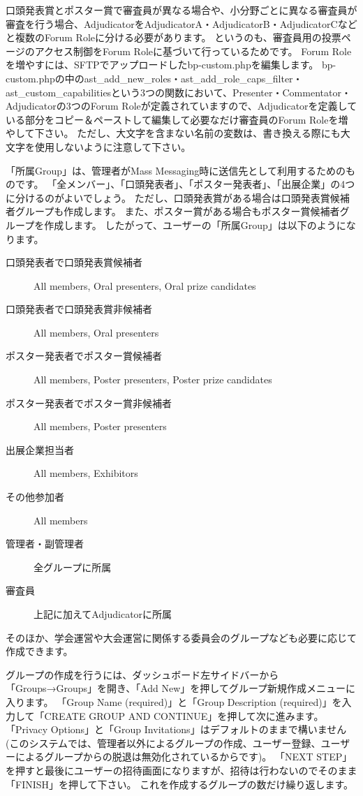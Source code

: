 \documentclass[titlepage,10pt,a4paper,uplatex]{jsbook}
\begin{document}
口頭発表賞とポスター賞で審査員が異なる場合や、小分野ごとに異なる審査員が審査を行う場合、AdjudicatorをAdjudicatorA・AdjudicatorB・AdjudicatorCなどと複数のForum Roleに分ける必要があります。
というのも、審査員用の投票ページのアクセス制御をForum Roleに基づいて行っているためです。
Forum Roleを増やすには、SFTPでアップロードしたbp-custom.phpを編集します。
bp-custom.phpの中のast\_add\_new\_roles・ast\_add\_role\_caps\_filter・ast\_custom\_capabilitiesという3つの関数において、Presenter・Commentator・Adjudicatorの3つのForum Roleが定義されていますので、Adjudicatorを定義している部分をコピー＆ペーストして編集して必要なだけ審査員のForum Roleを増やして下さい。
ただし、大文字を含まない名前の変数は、書き換える際にも大文字を使用しないように注意して下さい。

「所属Group」は、管理者がMass Messaging時に送信先として利用するためのものです。
「全メンバー」、「口頭発表者」、「ポスター発表者」、「出展企業」の4つに分けるのがよいでしょう。
ただし、口頭発表賞がある場合は口頭発表賞候補者グループも作成します。
また、ポスター賞がある場合もポスター賞候補者グループを作成します。
したがって、ユーザーの「所属Group」は以下のようになります。

\begin{description}
\item[口頭発表者で口頭発表賞候補者] All members, Oral presenters, Oral prize candidates
\item[口頭発表者で口頭発表賞非候補者] All members, Oral presenters
\item[ポスター発表者でポスター賞候補者] All members, Poster presenters, Poster prize candidates
\item[ポスター発表者でポスター賞非候補者] All members, Poster presenters
\item[出展企業担当者] All members, Exhibitors
\item[その他参加者] All members
\item[管理者・副管理者] 全グループに所属
\item[審査員] 上記に加えてAdjudicatorに所属
\end{description}

そのほか、学会運営や大会運営に関係する委員会のグループなども必要に応じて作成できます。

グループの作成を行うには、ダッシュボード左サイドバーから「Groups→Groups」を開き、「Add New」を押してグループ新規作成メニューに入ります。
「Group Name (required)」と「Group Description (required)」を入力して「CREATE GROUP AND CONTINUE」を押して次に進みます。
「Privacy Options」と「Group Invitations」はデフォルトのままで構いません(このシステムでは、管理者以外によるグループの作成、ユーザー登録、ユーザーによるグループからの脱退は無効化されているからです)。
「NEXT STEP」を押すと最後にユーザーの招待画面になりますが、招待は行わないのでそのまま「FINISH」を押して下さい。
これを作成するグループの数だけ繰り返します。
\end{document}
